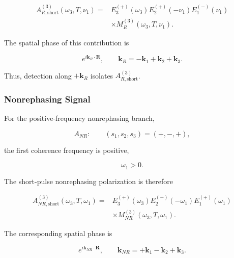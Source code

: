 \documentclass[11pt]{article}
\begin{document}
\begin{equation}
\boxed{
\begin{aligned}
A_{R,\mathrm{short}}^{(3)}
(\omega_3,T,\nu_1)
={}&
E_3^{(+)}(\omega_3)
E_2^{(+)}(-\nu_1)
E_1^{(-)}(\nu_1)
\\
&\times
M_R^{(3)}
(\omega_3,T,\nu_1).
\end{aligned}
}
\label{eq:AR_short}
\end{equation}

The spatial phase of this contribution is

\begin{equation}
e^{i\mathbf{k}_R\cdot\mathbf{R}},
\qquad
\mathbf{k}_R
=
-\mathbf{k}_1+\mathbf{k}_2+\mathbf{k}_3.
\end{equation}

Thus, detection along $+\mathbf{k}_R$ isolates
$A_{R,\mathrm{short}}^{(3)}$.


\subsubsection{Nonrephasing Signal}

For the positive-frequency nonrephasing branch,

\begin{equation}
A_{NR}:
\qquad
(s_1,s_2,s_3)
=
(+,-,+),
\end{equation}

the first coherence frequency is positive,

\begin{equation}
\omega_1>0.
\end{equation}

The short-pulse nonrephasing polarization is therefore

\begin{equation}
\boxed{
\begin{aligned}
A_{NR,\mathrm{short}}^{(3)}
(\omega_3,T,\omega_1)
={}&
E_3^{(+)}(\omega_3)
E_2^{(-)}(-\omega_1)
E_1^{(+)}(\omega_1)
\\
&\times
M_{NR}^{(3)}
(\omega_3,T,\omega_1).
\end{aligned}
}
\label{eq:ANR_short}
\end{equation}

The corresponding spatial phase is

\begin{equation}
e^{i\mathbf{k}_{NR}\cdot\mathbf{R}},
\qquad
\mathbf{k}_{NR}
=
+\mathbf{k}_1-\mathbf{k}_2+\mathbf{k}_3.
\end{equation}
\end{document}
